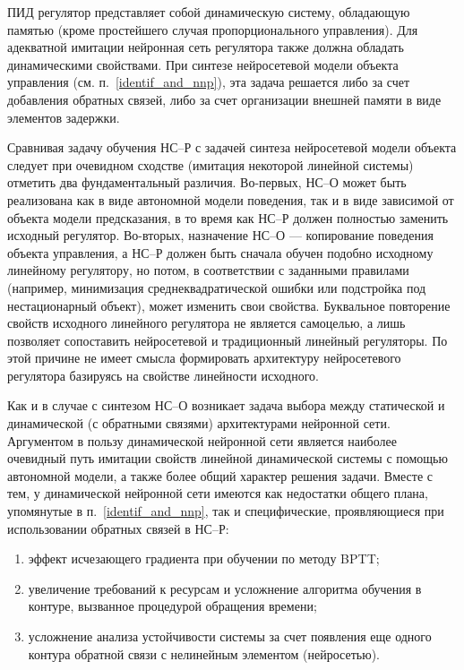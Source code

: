 ПИД регулятор представляет собой динамическую систему, обладающую
памятью (кроме простейшего случая пропорционального управления).  Для
адекватной имитации нейронная сеть регулятора также должна обладать
динамическими свойствами.  При синтезе нейросетевой модели объекта
управления (см. п.~\ref{identif_and_nnp}), эта задача решается либо за
счет добавления обратных связей, либо за счет организации внешней
памяти в виде элементов задержки.

Сравнивая задачу обучения НС--Р с задачей синтеза нейросетевой модели
объекта следует при очевидном сходстве (имитация некоторой линейной
системы) отметить два фундаментальный различия.  Во-первых, НС--О
может быть реализована как в виде автономной модели поведения, так и в
виде зависимой от объекта модели предсказания, в то время как НС--Р
должен полностью заменить исходный регулятор.  Во-вторых, назначение
НС--О --- копирование поведения объекта управления, а НС--Р должен
быть сначала обучен подобно исходному линейному регулятору, но потом,
в соответствии с заданными правилами (например, минимизация
среднеквадратической ошибки или подстройка под нестационарный объект),
может изменить свои свойства.  Буквальное повторение свойств исходного
линейного регулятора не является самоцелью, а лишь позволяет
сопоставить нейросетевой и традиционный линейный регуляторы.  По этой
причине не имеет смысла формировать архитектуру нейросетевого
регулятора базируясь на свойстве линейности исходного.

Как и в случае с синтезом НС--О возникает задача выбора между
статической и динамической (с обратными связями) архитектурами
нейронной сети.  Аргументом в пользу динамической нейронной сети
является наиболее очевидный путь имитации свойств линейной
динамической системы с помощью автономной модели, а также более общий
характер решения задачи.  Вместе с тем, у динамической нейронной сети
имеются как недостатки общего плана, упомянутые в
п.~\ref{identif_and_nnp}, так и специфические, проявляющиеся при
использовании обратных связей в НС--Р:

\begin{enumerate}
\item эффект исчезающего градиента при обучении по методу BPTT;
\item увеличение требований к ресурсам и усложнение алгоритма обучения
      в контуре, вызванное процедурой обращения времени;
\item усложнение анализа устойчивости системы за счет появления еще
      одного контура обратной связи с нелинейным элементом (нейросетью).
\end{enumerate}

